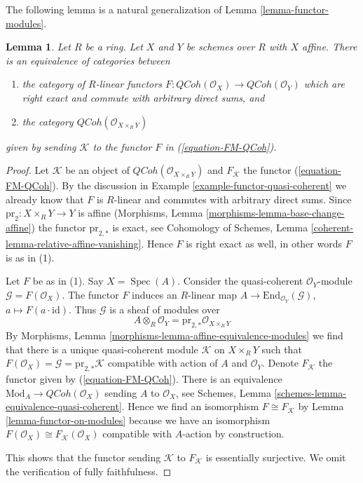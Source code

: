 \documentclass{stacks-project}
\theoremstyle{plain}
\newtheorem{lemma}[subsection]{Lemma}
\theoremstyle{definition}
\theoremstyle{remark}
\numberwithin{equation}{subsection}
\def\Spec{\mathop{\mathrm{Spec}}}
\def\QCoh{\mathit{QCoh}}
\begin{document}
\noindent
The following lemma is a natural generalization of
Lemma \ref{lemma-functor-modules}.

\begin{lemma}
\label{lemma-functor-quasi-coherent-from-affine}
Let $R$ be a ring. Let $X$ and $Y$ be schemes over $R$ with $X$ affine.
There is an equivalence of categories between
\begin{enumerate}
\item the category of $R$-linear functors
$F : \QCoh(\mathcal{O}_X) \to \QCoh(\mathcal{O}_Y)$
which are right exact and commute with arbitrary direct sums, and
\item the category $\QCoh(\mathcal{O}_{X \times_R Y})$
\end{enumerate}
given by sending $\mathcal{K}$ to the functor $F$ in (\ref{equation-FM-QCoh}).
\end{lemma}

\begin{proof}
Let $\mathcal{K}$ be an object of $\QCoh(\mathcal{O}_{X \times_R Y})$
and $F_\mathcal{K}$ the functor (\ref{equation-FM-QCoh}). By the discussion in
Example \ref{example-functor-quasi-coherent} we already know that
$F$ is $R$-linear and commutes with arbitrary direct sums.
Since $\text{pr}_2 : X \times_R Y \to Y$ is affine
(Morphisms, Lemma \ref{morphisms-lemma-base-change-affine}) the functor
$\text{pr}_{2, *}$ is exact, see Cohomology of Schemes, Lemma
\ref{coherent-lemma-relative-affine-vanishing}.
Hence $F$ is right exact as well, in other words $F$ is as in (1).

\medskip\noindent
Let $F$ be as in (1). Say $X = \Spec(A)$. Consider the quasi-coherent
$\mathcal{O}_Y$-module $\mathcal{G} = F(\mathcal{O}_X)$.
The functor $F$ induces an $R$-linear map
$A \to \text{End}_{\mathcal{O}_Y}(\mathcal{G})$,
$a \mapsto F(a \cdot \text{id})$. Thus $\mathcal{G}$ is a sheaf of modules over
$$
A \otimes_R \mathcal{O}_Y = \text{pr}_{2, *}\mathcal{O}_{X \times_R Y}
$$
By Morphisms, Lemma \ref{morphisms-lemma-affine-equivalence-modules}
we find that there is a unique quasi-coherent module $\mathcal{K}$
on $X \times_R Y$ such that $F(\mathcal{O}_X) = \mathcal{G} =
\text{pr}_{2, *}\mathcal{K}$ compatible with action
of $A$ and $\mathcal{O}_Y$. Denote $F_\mathcal{K}$ the functor
given by (\ref{equation-FM-QCoh}). There is an equivalence
$\text{Mod}_A \to \QCoh(\mathcal{O}_X)$ sending $A$ to $\mathcal{O}_X$, see
Schemes, Lemma \ref{schemes-lemma-equivalence-quasi-coherent}.
Hence we find an isomorphism $F \cong F_\mathcal{K}$ by
Lemma \ref{lemma-functor-on-modules} because we have an isomorphism
$F(\mathcal{O}_X) \cong F_\mathcal{K}(\mathcal{O}_X)$ compatible with
$A$-action by construction.

\medskip\noindent
This shows that the functor sending $\mathcal{K}$ to $F_\mathcal{K}$
is essentially surjective. We omit the verification of fully faithfulness.
\end{proof}
\end{document}
